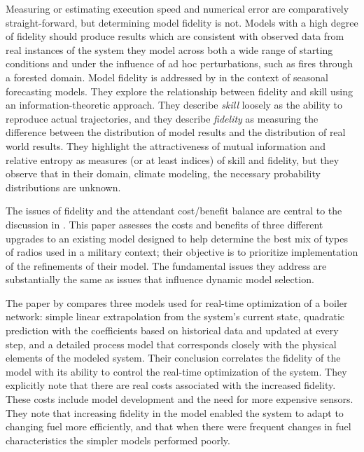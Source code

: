 Measuring or estimating execution speed and numerical error are
comparatively straight-forward, but determining model fidelity is not.
Models with a high degree of fidelity should produce results which are
consistent with observed data from real instances of the system they
model across both a wide range of starting conditions and under the
influence of ad hoc perturbations, such as fires through a forested
domain. Model fidelity is addressed by \cite{delsole2010model} in the
context of seasonal forecasting models. They explore the relationship
between fidelity and skill using an information-theoretic approach.
They describe \emph{skill} loosely as the ability to reproduce actual
trajectories, and they describe \emph{fidelity} as measuring the
difference between the distribution of model results and the
distribution of real world results.  They highlight the attractiveness
of mutual information and relative entropy as measures (or at least
indices) of skill and fidelity, but they observe that in their domain,
climate modeling, the necessary probability distributions are unknown.

The issues of fidelity and the attendant cost/benefit balance are
central to the dis\-cus\-sion in \cite{bailey1992scientific}.  This paper
assesses the costs and benefits of three dif\-fer\-ent upgrades to an
existing model designed to help de\-ter\-mine the best mix of types of
radios used in a mil\-i\-tary con\-text; their ob\-jec\-tive is to prioritize
im\-ple\-men\-ta\-tion of the refinements of their model. The fun\-da\-men\-tal
issues they address are substantially the same as issues that
in\-flu\-ence dynamic model selection.

The paper by \cite{yip2004effect} compares three models used for
real-time optimization of a boiler network: simple linear
extrapolation from the system's current state, quadratic prediction
with the coefficients based on historical data and updated at every
step, and a detailed process model that corresponds closely with the
physical elements of the modeled system. Their conclusion correlates
the fidelity of the model with its ability to control the real-time
optimization of the system. They explicitly note that there are real
costs associated with the increased fidelity. These costs include
model development and the need for more expensive sensors. They note
that increasing fidelity in the model enabled the system to adapt to
changing fuel more efficiently, and that when there were frequent
changes in fuel characteristics the simpler models performed poorly.

